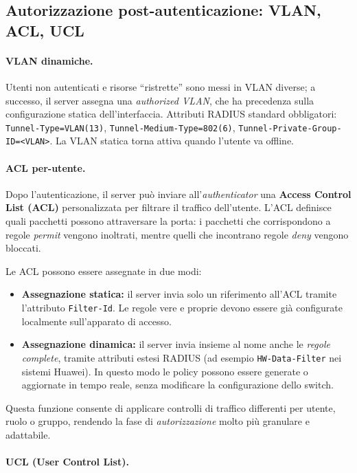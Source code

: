 \subsection{Autorizzazione post-autenticazione: VLAN, ACL, UCL}
\paragraph{VLAN dinamiche.} Utenti non autenticati e risorse “ristrette” sono messi in VLAN diverse; a successo, 
il server assegna una \emph{authorized VLAN}, che ha precedenza sulla configurazione statica dell’interfaccia. 
Attributi RADIUS standard obbligatori: \texttt{Tunnel-Type=VLAN(13)}, \texttt{Tunnel-Medium-Type=802(6)}, 
\texttt{Tunnel-Private-Group-ID=<VLAN>}. La VLAN statica torna attiva quando l’utente va offline. 

\paragraph{ACL per-utente.}
Dopo l’autenticazione, il server può inviare all’\emph{authenticator} una
\textbf{Access Control List (ACL)} personalizzata per filtrare il traffico
dell’utente. L’ACL definisce quali pacchetti possono attraversare la porta:
i pacchetti che corrispondono a regole \emph{permit} vengono inoltrati,
mentre quelli che incontrano regole \emph{deny} vengono bloccati.

\noindent
Le ACL possono essere assegnate in due modi:
\begin{itemize}
  \item \textbf{Assegnazione statica:} il server invia solo un riferimento
        all’ACL tramite l’attributo \texttt{Filter-Id}. Le regole vere e proprie
        devono essere già configurate localmente sull’apparato di accesso.
  \item \textbf{Assegnazione dinamica:} il server invia insieme al nome anche
        le \emph{regole complete}, tramite attributi estesi RADIUS
        (ad esempio \texttt{HW-Data-Filter} nei sistemi Huawei).
        In questo modo le policy possono essere generate o aggiornate in tempo reale,
        senza modificare la configurazione dello switch.
\end{itemize}

\noindent
Questa funzione consente di applicare controlli di traffico differenti per utente,
ruolo o gruppo, rendendo la fase di \emph{autorizzazione} molto più granulare e adattabile.
\paragraph{UCL (User Control List).}

